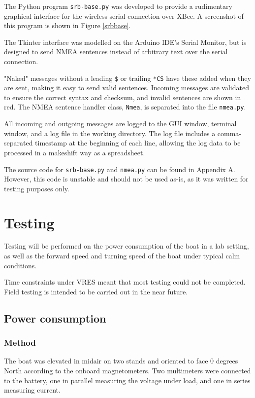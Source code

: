 \documentclass[a4paper]{IEEEtran}
\begin{document}
The Python program \texttt{srb-base.py} was developed to provide a rudimentary graphical interface for the wireless serial connection over XBee. A screenshot of this program is shown in Figure \ref{srbbase}.

The Tkinter interface was modelled on the Arduino IDE's Serial Monitor, but is designed to send NMEA sentences instead of arbitrary text over the serial connection.

"Naked" messages without a leading \texttt{\$} or trailing \texttt{*CS} have these added when they are sent, making it easy to send valid sentences. Incoming messages are validated to ensure the correct syntax and checksum, and invalid sentences are shown in red. The NMEA sentence handler class, \texttt{Nmea}, is separated into the file \texttt{nmea.py}.

All incoming and outgoing messages are logged to the GUI window, terminal window, and a log file in the working directory. The log file includes a comma-separated timestamp at the beginning of each line, allowing the log data to be processed in a makeshift way as a spreadsheet.

The source code for \texttt{srb-base.py} and \texttt{nmea.py} can be found in Appendix A. However, this code is unstable and should not be used as-is, as it was written for testing purposes only.

\section{Testing}
Testing will be performed on the power consumption of the boat in a lab setting, as well as the forward speed and turning speed of the boat under typical calm conditions.

Time constraints under VRES meant that most testing could not be completed. Field testing is intended to be carried out in the near future.

\subsection{Power consumption}

\subsubsection{Method}
The boat was elevated in midair on two stands and oriented to face 0 degrees North according to the onboard magnetometers. Two multimeters were connected to the battery, one in parallel measuring the voltage under load, and one in series measuring current.
\end{document}
